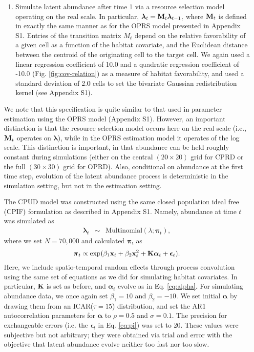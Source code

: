 \documentclass[12pt,fleqn]{article}
\begin{document}
\begin{flushleft}
\begin{enumerate}
  \item Simulate latent abundance after time 1 via a resource selection model operating on the real scale.  In particular, $\boldsymbol{\lambda}_t = {\bf M}_t \boldsymbol{\lambda}_{t-1}$, where ${\bf M}_t$ is defined in exactly the same manner as for the OPRS model presented in Appendix S1.  Entries of the transition matrix $M_t$ depend on the relative favorability of a given cell as a function of the habitat covariate, and the Euclidean distance between the centroid of the originating cell to the target cell. We again used a linear regression coefficient of 10.0 and a quadratic regression coefficient of -10.0 (Fig. \ref{fig:cov-relation}) as a measure of habitat favorability, and used a standard deviation of 2.0 cells to set the bivariate Gaussian redistribution kernel (see Appendix S1).
\end{enumerate}
We note that this specification is quite similar to that used in parameter estimation using the OPRS model (Appendix S1).  However, an important distinction is that the resource selection model occurs here on the real scale (i.e., ${\bf M}_t$ operates on $\boldsymbol{\lambda}$), while in the OPRS estimation model it operates of the log scale. This distinction is important, in that abundance can be held roughly constant during simulations (either on the central $(20 \times 20)$ grid for CPRD or the full $(30 \times 30)$ grid for OPRD).  Also, conditional on abundance at the first time step, evolution of the latent abundance process is deterministic in the simulation setting, but not in the estimation setting.

\hspace{.5in} The CPUD model was constructed using the same closed population ideal free (CPIF) formulation as described in Appendix S1.  Namely, abundance at time $t$ was simulated as
\begin{eqnarray*}
  \boldsymbol{\lambda}_t & \sim & \text{Multinomial}(\lambda; \boldsymbol{\pi}_t),
\end{eqnarray*}
where we set $N=70,000$ and calculated $\boldsymbol{\pi}_t$ as
\begin{eqnarray}
  \boldsymbol{\pi}_{t} \propto \exp(\beta_1 {\bf x}_t + \beta_2 {\bf x}_t^2 + {\bf K}\boldsymbol{\alpha}_t + \boldsymbol{\epsilon}_t).
  \label{eq:pi}
\end{eqnarray}
Here, we include spatio-temporal random effects through process convolution using the same set of equations as we did for simulating habitat covariates.  In particular, ${\bf K}$ is set as before, and $\boldsymbol{\alpha}_t$ evolve as in Eq. \ref{eq:alpha}.  For simulating abundance data, we once again set $\beta_1 = 10$ and $\beta_2 = -10$.  We set initial $\boldsymbol{\alpha}$ by drawing them from an ICAR($\tau=15$) distribution, and set the AR1 autocorrelation parameters for $\boldsymbol{\alpha}$ to $\rho = 0.5 $ and $\sigma = 0.1$.  The precision for exchangeable errors (i.e. the $\boldsymbol{\epsilon}_t$ in Eq. \ref{eq:pi}) was set to 20.  These values were subjective but not arbitrary; they were obtained via trial and error with the objective that latent abundance evolve neither too fast nor too slow.


\end{flushleft}
\end{document}
